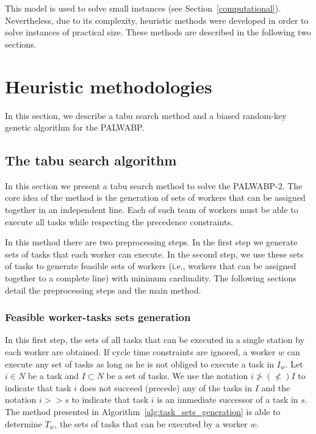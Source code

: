 \documentclass{singlecol-new}
\begin{document}
  
This model is used to solve small instances (see Section~\ref{computational}). Nevertheless, due to its complexity, heuristic methods were developed in order to solve instances of practical size. These methods are described in the following two sections.

\section{Heuristic methodologies}\label{methodologies}

In this section, we describe a tabu search method and a biased random-key genetic algorithm for the PALWABP.

\subsection{The tabu search algorithm}\label{heuristics}

In this section we present a tabu search method to solve the PALWABP-2. The core idea of the method is the generation of sets of workers that can be assigned together in an independent line. Each of such team of workers must be able to execute all tasks while respecting the precedence constraints.

In this method there are two preprocessing steps. In the first step we generate sets of tasks that each worker can execute. In the second step, we use these sets of tasks to generate feasible sets of workers (i.e., workers that can be assigned together to a complete line) with minimum cardinality. The following sections detail the preprocessing steps and the main method.

\subsubsection{Feasible worker-tasks sets generation}

In this first step, the sets of all tasks that can be executed in a single station by each worker are obtained. If cycle time constraints are ignored, a worker $w$ can execute any set of tasks as long as he is not obliged to execute a task in $I_w$. Let ${i\in N}$ be a task and $I \subset N$ be a set of tasks.  We use the notation $i \not> (\not<) I$ to indicate that task $i$ does not succeed (precede) any of the tasks in $I$ and the notation $i >> s$ to indicate that task $i$ is an immediate successor of a task in $s$.  The method presented in Algorithm~\ref{alg:task_sets_generation} is able to determine $T_w$, the sets of tasks that can be executed by a worker $w$.
\end{document}
